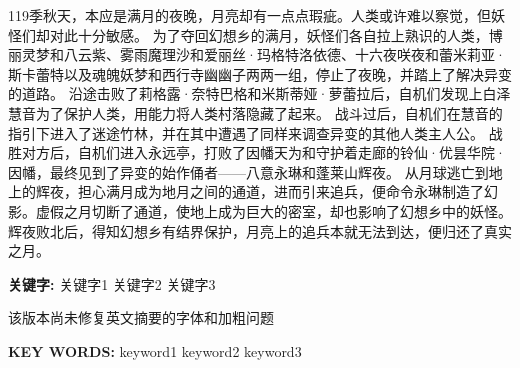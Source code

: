 \begin{cnabstract}
    \vspace{12pt}
    119季秋天，本应是满月的夜晚，月亮却有一点点瑕疵。人类或许难以察觉，但妖怪们却对此十分敏感。
    为了夺回幻想乡的满月，妖怪们各自拉上熟识的人类，博丽灵梦和八云紫、雾雨魔理沙和爱丽丝·玛格特洛依德、十六夜咲夜和蕾米莉亚·斯卡蕾特以及魂魄妖梦和西行寺幽幽子两两一组，停止了夜晚，并踏上了解决异变的道路。
    沿途击败了莉格露·奈特巴格和米斯蒂娅·萝蕾拉后，自机们发现上白泽慧音为了保护人类，用能力将人类村落隐藏了起来。
    战斗过后，自机们在慧音的指引下进入了迷途竹林，并在其中遭遇了同样来调查异变的其他人类主人公。
    战胜对方后，自机们进入永远亭，打败了因幡天为和守护着走廊的铃仙·优昙华院·因幡，最终见到了异变的始作俑者——八意永琳和蓬莱山辉夜。
    从月球逃亡到地上的辉夜，担心满月成为地月之间的通道，进而引来追兵，便命令永琳制造了幻影。虚假之月切断了通道，使地上成为巨大的密室，却也影响了幻想乡中的妖怪。
    辉夜败北后，得知幻想乡有结界保护，月亮上的追兵本就无法到达，便归还了真实之月。
    \par\textbf{关键字: } 关键字1 \qquad 关键字2 \qquad 关键字3
\end{cnabstract}
\vspace{12pt}
\begin{enabstract}
    \begin{myfont}
        \vspace{12pt}
        该版本尚未修复英文摘要的字体和加粗问题\\
        \lipsum[1]
        \par\textbf{KEY WORDS:} keyword1 \qquad keyword2 \qquad keyword3
    \end{myfont}
\end{enabstract}